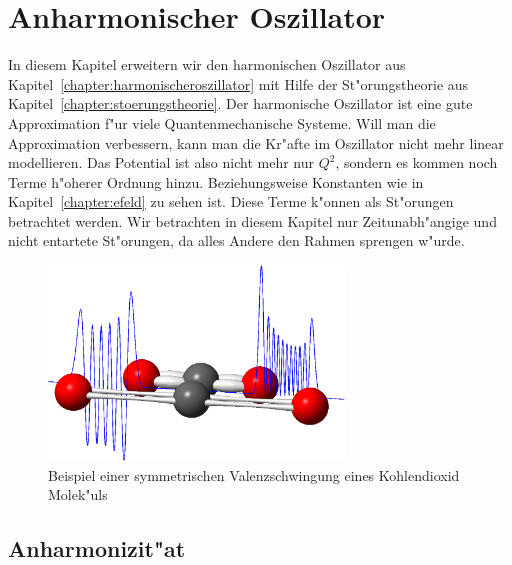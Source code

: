 \chapter{Anharmonischer Oszillator\label{chapter:anharmonisch}}
\begin{refsection}

In diesem Kapitel erweitern wir den harmonischen Oszillator aus
Kapitel~\ref{chapter:harmonischeroszillator} mit Hilfe der St"orungstheorie aus
Kapitel~\ref{chapter:stoerungstheorie}.
Der harmonische Oszillator ist eine gute Approximation f"ur viele
Quantenmechanische Systeme.
Will man die Approximation verbessern,
kann man die Kr"afte im Oszillator nicht mehr linear modellieren.
Das Potential ist also nicht mehr nur $Q^2$,
sondern es kommen noch Terme h"oherer Ordnung hinzu.
Beziehungsweise Konstanten wie in Kapitel~\ref{chapter:efeld} zu sehen ist.
Diese Terme k"onnen als St"orungen betrachtet werden.
Wir betrachten in diesem Kapitel nur Zeitunabh"angige und nicht entartete
St"orungen, da alles Andere den Rahmen sprengen w"urde.

\begin{figure}	%
\centering
\includegraphics[width=0.7\textwidth]{anharmonisch/images/Titelbild.png}
\caption{Beispiel einer symmetrischen Valenzschwingung eines Kohlendioxid Molek"uls
\label{skript:Titelbild}}
\end{figure}

\section{Anharmonizit"at}


\end{refsection}
